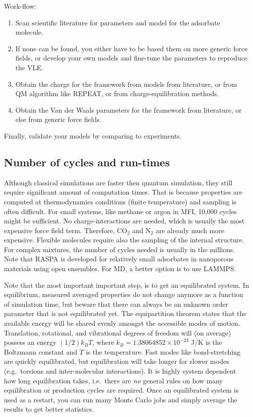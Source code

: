 Work-flow:
\begin{enumerate}
\item{Scan scientific literature for parameters and model for the adsorbate molecule.}
\item{If none can be found, you either have to be based them on more generic force fields, or develop your own models and fine-tune
    the parameters to reproduce the VLE.}
\item{Obtain the charge for the framework from models from literature, or from QM algorithm like REPEAT, or from charge-equilibration methods.}
\item{Obtain the Van der Waals parameters for the framework from literature, or else from generic force fields.}
\end{enumerate}
Finally, validate your models by comparing to experiments.

\subsection*{Number of cycles and run-times}

Although classical simulations are faster then quantum simulation, they still require significant amount of computation times.
That is because properties are computed at thermodynamics conditions (finite temperature) and sampling is often difficult.
For small systems, like methane or argon in MFI,  10,000 cycles might be sufficient. No charge-interactions are needed, which is
usually the most expensive force field term. Therefore, CO$_2$ and N$_2$ are already much more expensive.
Flexible molecules require also the sampling of the internal structure. For complex mixtures, the number of cycles needed is
usually in the millions.
Note that RASPA is developed for relatively small adsorbates in nanoporous materials using open ensembles.
For MD, a better option is to use LAMMPS\cite{Plimpton1995}.

Note that the most important important step, is to get an equilibrated system.
In equilibrium, measured averaged properties do not change
anymore as a function of simulation time,
but beware that there can always be an unknown order parameter that is not equilibrated yet.
The equipartition theorem states that the available energy will be shared evenly amongst the accessible modes of motion.
Translation, rotational, and vibrational degrees of freedom will (on average) possess an energy $(1/2) k_B T$,
where $k_B=1.38064852\times10^{-23}$ J/K is the Boltzmann constant and $T$ is the temperature.
Fast modes like bond-stretching are quickly equilibrated, but equilibration will take longer for slower modes (e.g.\ torsions and inter-molecular interactions).
It is highly system dependent how long equilibration takes, i.e.\
there are \emph{no} general rules on how many equilibration or production cycles are required.
Once an equilibrated system is used as a restart, you can run many Monte Carlo jobs and simply average the results to get better statistics.



